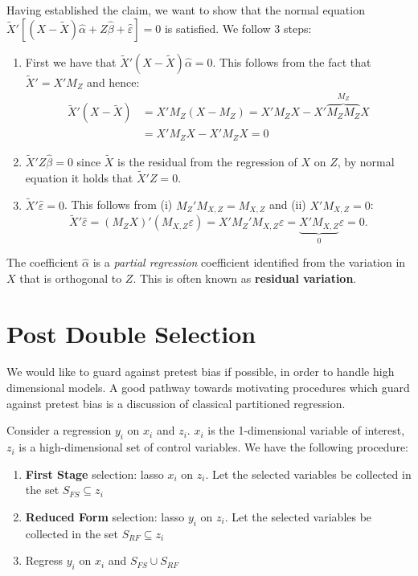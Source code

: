 \documentclass[12pt,]{book}
\providecommand{\tightlist}{%
  \setlength{\itemsep}{0pt}\setlength{\parskip}{0pt}}
\begin{document}
Having established the claim, we want to show that the normal equation \(\tilde{X}' \left[ (X - \tilde{X})\hat{\alpha} + Z \hat{\beta} +\hat{\varepsilon} \right] = 0\) is satisfied. We follow 3 steps:

\begin{enumerate}
\def\labelenumi{\arabic{enumi}.}
\item
  First we have that \(\tilde{X}' (X - \tilde{X})\hat{\alpha} = 0\). This follows from the fact that \(\tilde{X}' = X' M_Z\) and hence:
  \[
    \begin{aligned}
    \tilde{X}' (X - \tilde{X})  &  = X' M_Z (X - M_Z) = X' M_Z X - X' \overbrace{M_Z M_Z}^{M_Z} X \\ & = X'M_Z X - X' M_Z X = 0
    \end{aligned}
  \]
\item
  \(\tilde{X}' Z \hat{\beta} = 0\) since \(\tilde{X}\) is the residual from the regression of \(X\) on \(Z\), by normal equation it holds that \(\tilde{X}' Z = 0\).
\item
  \(\tilde{X}' \hat{\varepsilon} = 0\). This follows from (i) \(M_Z ' M_{X, Z} = M_{X,Z}\) and (ii) \(X' M_{X, Z} = 0\):
  \[
    \tilde{X}' \hat{\varepsilon} = (M_Z X)' (M_{X, Z} \varepsilon)  = X'M_Z' M_{X, Z} \varepsilon = \underbrace{X' M_{X, Z}}_0 \varepsilon = 0.
  \]
  \[\tag*{$\blacksquare$}\]
\end{enumerate}

The coefficient \(\hat{\alpha}\) is a \emph{partial regression} coefficient identified from the variation in \(X\) that is orthogonal to \(Z\). This is often known as \textbf{residual variation}.

\hypertarget{post-double-selection}{%
\section{Post Double Selection}\label{post-double-selection}}

We would like to guard against pretest bias if possible, in order to handle high dimensional models. A good pathway towards motivating procedures which guard against pretest bias is a discussion of classical partitioned regression.

Consider a regression \(y_i\) on \(x_i\) and \(z_i\). \(x_i\) is the 1-dimensional variable of interest, \(z_i\) is a high-dimensional set of control variables. We have the following procedure:

\begin{enumerate}
\def\labelenumi{\arabic{enumi}.}
\tightlist
\item
  \textbf{First Stage} selection: lasso \(x_i\) on \(z_i\). Let the selected variables be collected in the set \(S_{FS} \subseteq z_i\)
\item
  \textbf{Reduced Form} selection: lasso \(y_i\) on \(z_i\). Let the selected variables be collected in the set \(S_{RF} \subseteq z_i\)
\item
  Regress \(y_i\) on \(x_i\) and \(S_{FS} \cup S_{RF}\)
\end{enumerate}
\end{document}
